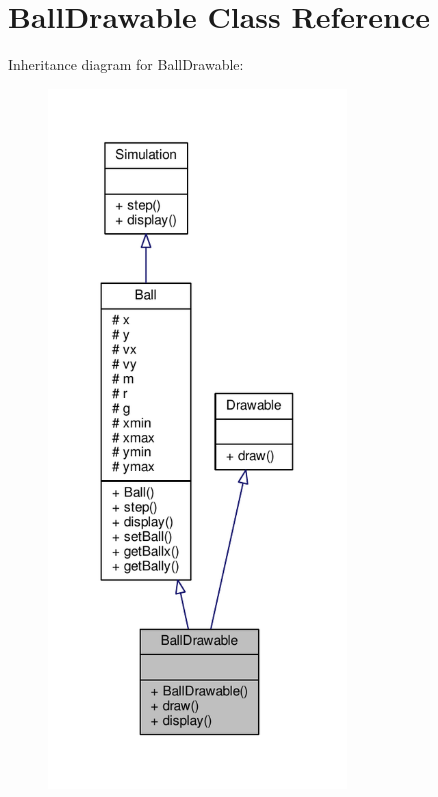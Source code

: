 \hypertarget{classBallDrawable}{}\section{Ball\+Drawable Class Reference}
\label{classBallDrawable}


Inheritance diagram for Ball\+Drawable\+:
\nopagebreak
\begin{figure}[H]
\begin{center}
\leavevmode
\includegraphics[width=224pt]{classBallDrawable__inherit__graph}
\end{center}
\end{figure}


